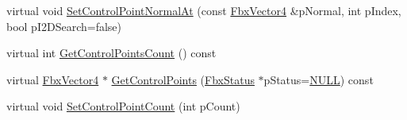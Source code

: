 \begin{DoxyCompactItemize}
virtual void \hyperlink{class_fbx_geometry_base_a219c072f0c9a67ddcc928ab3998f9494}{Set\+Control\+Point\+Normal\+At} (const \hyperlink{class_fbx_vector4}{Fbx\+Vector4} \&p\+Normal, int p\+Index, bool p\+I2\+D\+Search=false)
\item 
virtual int \hyperlink{class_fbx_geometry_base_aa9f42ae6a958036722670143fabf3b17}{Get\+Control\+Points\+Count} () const
\item 
virtual \hyperlink{class_fbx_vector4}{Fbx\+Vector4} $\ast$ \hyperlink{class_fbx_geometry_base_ad4db22a2f2e673c216cacdc9cd172d77}{Get\+Control\+Points} (\hyperlink{class_fbx_status}{Fbx\+Status} $\ast$p\+Status=\hyperlink{fbxarch_8h_a070d2ce7b6bb7e5c05602aa8c308d0c4}{N\+U\+LL}) const
\item 
virtual void \hyperlink{class_fbx_geometry_base_aea3fc519575d88c430221b0e74040b0c}{Set\+Control\+Point\+Count} (int p\+Count)
\end{DoxyCompactItemize}
